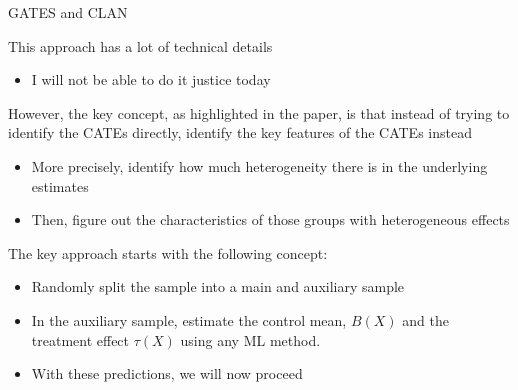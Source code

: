 \documentclass[notes,11pt, aspectratio=169]{beamer}
\newenvironment{wideitemize}{\itemize\addtolength{\itemsep}{10pt}}{\enditemize}
\begin{document}
\begin{frame}{GATES and CLAN}
  \begin{wideitemize}
  \item This approach has a lot of technical details
    \begin{itemize}
    \item I will not be able to do it justice today
    \end{itemize}
  \item However, the key concept, as highlighted in the paper, is that
    instead of trying to identify the CATEs directly, identify the key
    features of the CATEs instead
    \begin{itemize}
    \item More precisely, identify how much heterogeneity there is in
      the underlying estimates
    \item Then, figure out the characteristics of those groups with
      heterogeneous effects
    \end{itemize}
  \item The key approach starts with the following concept:
    \begin{itemize}
    \item Randomly split the sample into a main and auxiliary sample
    \item In the auxiliary sample, estimate the control mean, $B(X)$
      and the treatment effect $\tau(X)$ using any ML method.
    \item With these predictions, we will now proceed
    \end{itemize}
  \end{wideitemize}
\end{frame}
\end{document}
